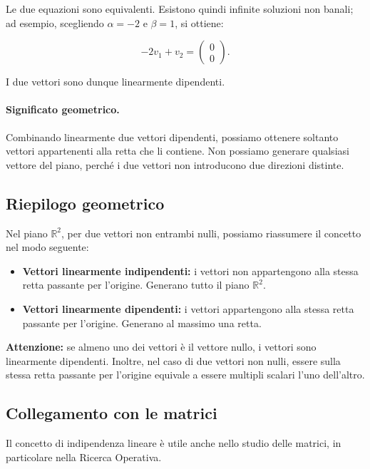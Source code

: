 Le due equazioni sono equivalenti. Esistono quindi infinite soluzioni non banali; ad esempio, scegliendo \(\alpha=-2\) e \(\beta=1\), si ottiene:

\[
-2v_1+v_2=
\begin{pmatrix}
0\\
0
\end{pmatrix}.
\]

I due vettori sono dunque linearmente dipendenti.

\paragraph{Significato geometrico.}

Combinando linearmente due vettori dipendenti, possiamo ottenere soltanto vettori appartenenti alla retta che li contiene. Non possiamo generare qualsiasi vettore del piano, perché i due vettori non introducono due direzioni distinte.

\subsection{Riepilogo geometrico}

Nel piano \(\mathbb{R}^2\), per due vettori non entrambi nulli, possiamo riassumere il concetto nel modo seguente:

\begin{itemize}
    \item \textbf{Vettori linearmente indipendenti:} i vettori non appartengono alla stessa retta passante per l'origine. Generano tutto il piano \(\mathbb{R}^2\).
    \item \textbf{Vettori linearmente dipendenti:} i vettori appartengono alla stessa retta passante per l'origine. Generano al massimo una retta.
\end{itemize}

\textbf{Attenzione:} se almeno uno dei vettori è il vettore nullo, i vettori sono linearmente dipendenti. Inoltre, nel caso di due vettori non nulli, essere sulla stessa retta passante per l'origine equivale a essere multipli scalari l'uno dell'altro.

\subsection{Collegamento con le matrici}

Il concetto di indipendenza lineare è utile anche nello studio delle matrici, in particolare nella Ricerca Operativa.

